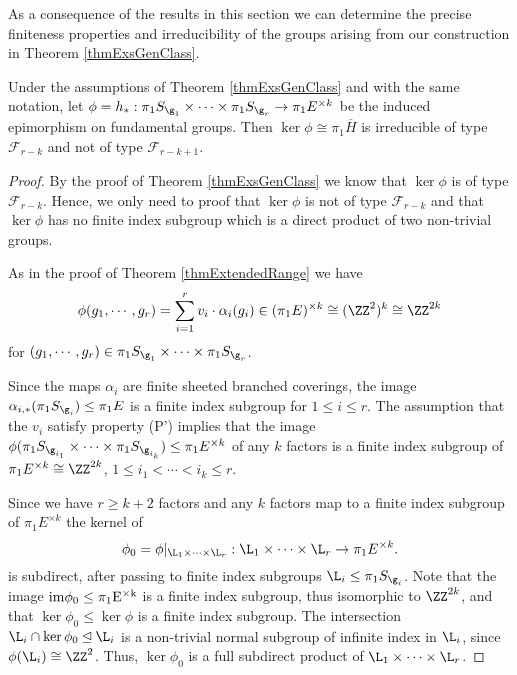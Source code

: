 As a consequence of the results in this section we can determine the precise finiteness properties and irreducibility of the groups arising from our construction in Theorem \ref{thmExsGenClass}.
\begin{lemma}
 Under the assumptions of Theorem \ref{thmExsGenClass} and with the same notation, let  $\phi=h_{\ast}: \pi_1 S_{\g_1}\times \cdots \times \pi_1 S_{\g_r}\rightarrow \pi_1 E^{\times k}$ be the induced epimorphism on fundamental groups. Then $\ker \phi \cong \pi_1 \overline{H}$ is irreducible of type $\mathcal{F}_{r-k}$ and not of type $\mathcal{F}_{r-k+1}$.
 \label{lemNotProdNotFr}
\end{lemma}
\begin{proof}
 By the proof of Theorem \ref{thmExsGenClass} we know that $\ker \phi$ is of type $\mathcal{F}_{r-k}$. Hence, we only need to proof that $\ker \phi$ is not of type $\mathcal{F}_{r-k}$ and that $\ker \phi$ has no finite index subgroup which is a direct product of two non-trivial groups.
 
 As in the proof of Theorem \ref{thmExtendedRange} we have
 \[
  \phi(g_1,\cdots,g_r)=\sum_{i=1}^r v_i\cdot \alpha_i(g_i) \in (\pi_1 E)^{\times k}\cong (\ZZ^2)^{k}\cong \ZZ^{2k}
 \]
 for $(g_1,\cdots,g_r)\in \pi_1 S_{\g_1}\times \cdots \times \pi_1 S_{\g_r}$.
 
 Since the maps $\alpha_i$ are finite sheeted branched coverings, the image $\alpha_{i,\ast}(\pi_1S_{\g_i})\leq \pi_1 E$ is a finite index subgroup for $1\leq i \leq r$. The assumption that the $v_i$ satisfy property (P') implies that the image $\phi(\pi_1 S_{\g_{i_1}}\times \cdots \times \pi_1 S_{\g_{i_k}})\leq \pi_1 E^{\times k}$ of any $k$ factors is a finite index subgroup of $\pi_1 E^{\times k}\cong \ZZ^{2k}$, $1\leq i_1 < \cdots < i_k\leq r$.
 
 
 Since we have $r\geq k+2$ factors and any $k$ factors map to a finite index subgroup of $\pi_1 E^{\times k}$ the kernel of 
\[ 
 \phi_0=\phi|_{\L_1\times \cdots \times \L_r}: \L_1 \times \cdots \times \L_r\rightarrow \pi_1 E^{\times k}.
\]
is subdirect, after passing to finite index subgroups $\L_i\leq \pi_1 S_{\g_i}$. Note that the image $\rm{im} \phi_0\leq \pi_1 E^{\times k}$ is a finite index subgroup, thus isomorphic to $\ZZ^{2k}$, and that $\ker \phi_0 \leq \ker \phi$ is a finite index subgroup. The intersection $\L_i \cap \ker \phi_0\unlhd \L_i$ is a non-trivial normal subgroup of infinite index in $\L_i$, since $\phi(\L_i)\cong \ZZ^2$. Thus, $\ker \phi_0$ is a full subdirect product of $\L_1 \times \cdots \times \L_r$.
 

\end{proof}
